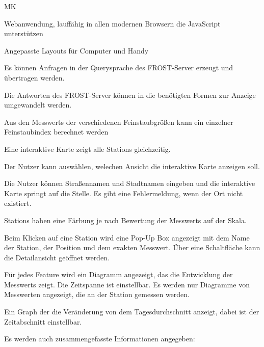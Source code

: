 \begin{Kriterien}{MK}

	\item \gls{Webanwendung}, lauffähig in allen modernen Browsern die JavaScript unterstützen

	\item Angepasste Layouts für Computer und \gls{Handy}
	
	\item Es können Anfragen in der \gls{Querysprache} des \gls{FROST-Server} erzeugt und übertragen werden.
	
	\item Die Antworten des \gls{FROST-Server} können in die benötigten Formen zur Anzeige umgewandelt werden.
	
	\item Aus den \glspl{Messwert} der verschiedenen Feinstaubgrößen kann ein einzelner \gls{Feinstaubindex} berechnet werden

	\item Eine interaktive Karte zeigt alle \glspl{Station} gleichzeitig. 
	
	\item Der Nutzer kann auswählen, welechen Ansicht die interaktive Karte anzeigen soll.
	
	\item Die Nutzer können Straßennamen und Stadtnamen eingeben und die interaktive Karte springt auf die Stelle. Es gibt eine Fehlermeldung, wenn der Ort nicht existiert.

	\item \glspl{Station} haben eine Färbung je nach Bewertung der \glspl{Messwert} auf der Skala.
	
	\item Beim Klicken auf eine \gls{Station} wird eine \gls{Pop-Up} Box angezeigt mit dem Name der Station, der Position und dem exakten Messwert.
		Über eine Schaltfläche kann die Detailansicht geöffnet werden. 
	
	\item Für jedes Feature wird ein Diagramm angezeigt, das die Entwicklung der \glspl{Messwert} zeigt. Die Zeitspanne ist einstellbar. Es werden nur Diagramme von Messwerten angezeigt, die an der \gls{Station} gemessen werden.
	
	\item Ein \gls{Graph} der die Veränderung von dem Tagesdurchschnitt anzeigt, dabei ist der Zeitabschnitt einstellbar.
	
	\item Es werden auch zusammengefasste Informationen angegeben: 
\end{Kriterien}
		
